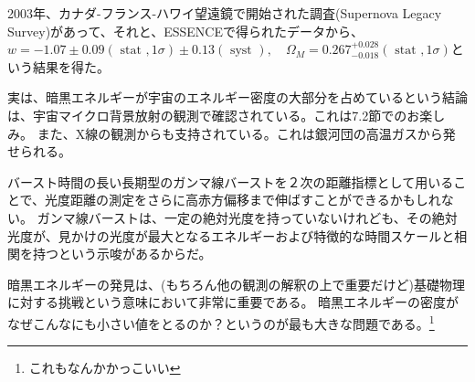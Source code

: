 \documentclass[11pt,a4paper,dvipdfmx]{jsarticle}
\theoremstyle{plain}
\theoremstyle{break}
\begin{document}
2003年、カナダ-フランス-ハワイ望遠鏡で開始された調査(Supernova Legacy Survey)があって、それと、ESSENCEで得られたデータから、$w=-1.07 \pm 0.09(\text { stat }, 1 \sigma) \pm 0.13(\text { syst }), \quad \Omega_{M}=0.267_{-0.018}^{+0.028}(\text { stat }, 1 \sigma)$という結果を得た。

実は、暗黒エネルギーが宇宙のエネルギー密度の大部分を占めているという結論は、宇宙マイクロ背景放射の観測で確認されている。これは7.2節でのお楽しみ。
また、X線の観測からも支持されている。これは銀河団の高温ガスから発せられる。

バースト時間の長い長期型のガンマ線バーストを２次の距離指標として用いることで、光度距離の測定をさらに高赤方偏移まで伸ばすことができるかもしれない。
ガンマ線バーストは、一定の絶対光度を持っていないけれども、その絶対光度が、見かけの光度が最大となるエネルギーおよび特徴的な時間スケールと相関を持つという示唆があるからだ。

暗黒エネルギーの発見は、(もちろん他の観測の解釈の上で重要だけど)基礎物理に対する挑戦という意味において非常に重要である。
暗黒エネルギーの密度がなぜこんなにも小さい値をとるのか？というのが最も大きな問題である。\footnote{これもなんかかっこいい}
\end{document}
